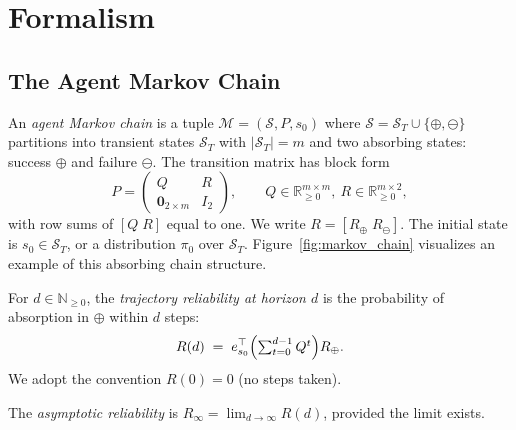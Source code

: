 
\section{Formalism}
\label{sec:formal}

\subsection{The Agent Markov Chain}

\begin{definition}
\label{def:amc}
An \emph{agent Markov chain} is a tuple $\mathcal{M}=(\mathcal{S},P,s_0)$ where
$\mathcal{S}=\mathcal{S}_T\cup\{\oplus,\ominus\}$ partitions into transient
states $\mathcal{S}_T$ with $|\mathcal{S}_T|=m$ and two absorbing states:
success $\oplus$ and failure $\ominus$. The transition matrix has block form
\begin{equation}
P =
\begin{pmatrix} Q & R \\ \mathbf{0}_{2\times m} & I_2 \end{pmatrix},
\qquad Q\in\mathbb{R}_{\ge 0}^{m\times m},\ R\in\mathbb{R}_{\ge 0}^{m\times 2},
\label{eq:block}
\end{equation}
with row sums of $[Q\;R]$ equal to one. We write $R=[R_\oplus\;R_\ominus]$.
The initial state is $s_0\in\mathcal{S}_T$, or a distribution $\pi_0$ over
$\mathcal{S}_T$. Figure~\ref{fig:markov_chain} visualizes an example of this absorbing chain structure.
\end{definition}

\begin{definition}
\label{def:reliab}
For $d\in\mathbb{N}_{\ge 0}$, the \emph{trajectory reliability at horizon $d$}
is the probability of absorption in $\oplus$ within $d$ steps:
\begin{equation}
R(d) \;=\; e_{s_0}^{\top}\Bigl(\textstyle\sum_{t=0}^{d-1}Q^{t}\Bigr)R_{\oplus}.
\label{eq:rd}
\end{equation}
We adopt the convention $R(0)=0$ (no steps taken).
\end{definition}

\begin{definition}
\label{def:reliabinf}
The \emph{asymptotic reliability} is $R_\infty=\lim_{d\to\infty}R(d)$,
provided the limit exists.
\end{definition}

